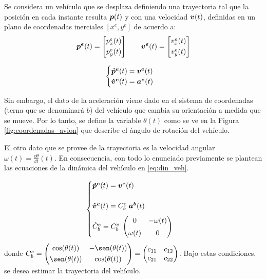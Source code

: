 
	Se considera un vehículo que se desplaza definiendo una trayectoria tal que la posición en cada instante resulta $\boldsymbol{p}(t)$ y con una velocidad $\boldsymbol{v}(t)$, definidas en un plano de coordenadas inerciales $[x^e,y^e]$ de acuerdo a:
	\begin{equation*}
		\vect{p^e}(t) = \begin{bmatrix} p^e_x(t) \\[0.3em] p^e_y(t) \end{bmatrix} \qquad%
		\vect{v^e}(t) = \begin{bmatrix} v^e_x(t) \\[0.3em] v^e_y(t) \end{bmatrix}
	\end{equation*}

	\begin{equation}
		\begin{cases}
			\boldsymbol{\dot{p}^e}(t) = \boldsymbol{v^e}(t)\\
			\boldsymbol{\dot{v}^e}(t) = \boldsymbol{a^e}(t)\\
		\end{cases}
		\label{eq:din_inercial}
	\end{equation}

	Sin embargo, el dato de la aceleración viene dado en el sistema de coordenadas (terna que se denominará $b$) del vehículo que cambia su orientación a medida que se mueve. Por lo tanto, se define la variable $\theta(t)$ como se ve en la Figura \ref{fig:coordenadas_avion} que describe el ángulo de rotación del vehículo.

	El otro dato que se provee de la trayectoria es la velocidad angular $\omega(t) = \frac{\dd \theta}{\dd t} (t)$. En consecuencia, con todo lo enunciado previamente se plantean las ecuaciones de la dinámica del vehículo en \eqref{eq:din_veh}.

	\begin{equation}
		\begin{cases}
			\boldsymbol{\dot{p}^e}(t) = \boldsymbol{v^e}(t)\\[1.4em]
			\boldsymbol{\dot{v}^e}(t) = C^e_b \; \boldsymbol{a^b}(t)\\[0.6em]
			\dot{C}^e_b = {C}^e_b \; \begin{pmatrix} 0& -\omega(t)\\[0.3em] \omega(t)&0 \end{pmatrix}
		\end{cases}
		\label{eq:din_veh}
	\end{equation}
	donde $C^e_b = \begin{pmatrix} \cos(\theta(t)) & -\sen(\theta(t))\\[0.3em] \sen(\theta(t)) & \cos(\theta(t))\end{pmatrix} = \begin{pmatrix} c_{11}&c_{12}\\c_{21}&c_{22}\end{pmatrix}$. Bajo estas condiciones, se desea estimar la trayectoria del vehículo.




